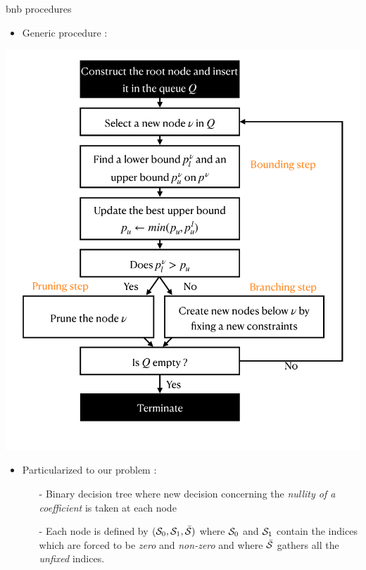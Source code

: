 \documentclass[final]{beamer}
\newlength{\onecolwid}
\newlength{\twocolwid}
\newcommand{\emphone}[1]{\textit{\color{norange}#1}}
\begin{document}
\begin{frame}[t]
\begin{columns}[t]
\begin{column}{\twocolwid}
\begin{columns}[t,totalwidth=\twocolwid]
\begin{column}{\onecolwid}
            \begin{block}{\gls{bnb} procedures}
                \begin{itemize}
                    \item \hspace*{0.1em} Generic procedure :
                \end{itemize}
                \includegraphics[width=\linewidth]{imgs/bnb.pdf}
                \vspace*{-3em} 
                \begin{itemize}
                    \item \hspace*{0.1em} Particularized to our problem :
                    \begin{itemize}
                        \normalsize \item[-] \hspace*{0.1em} Binary decision tree where new decision concerning the \emphone{nullity of a coefficient} is taken at each node
                        \item[-] \hspace*{0.1em} Each node is defined by $(\mathcal{S}_0,\mathcal{S}_1,\bar{\mathcal{S}})$ where \(\mathcal{S}_0\) and \(\mathcal{S}_1\) contain the indices which are forced to be \emphone{zero} and \emphone{non-zero} and where \(\bar{\mathcal{S}}\) gathers all the \emphone{unfixed} indices.

\end{itemize}
\end{itemize}
\end{block}
\end{column}
\end{columns}
\end{column}
\end{columns}
\end{frame}
\end{document}
